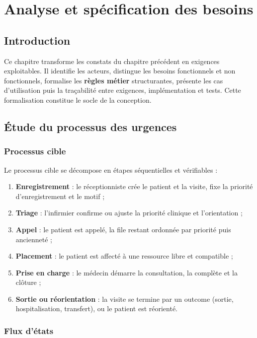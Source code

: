 \chapter{Analyse et spécification des besoins}

\section{Introduction}

Ce chapitre transforme les constats du chapitre précédent en exigences exploitables. Il identifie les acteurs, distingue les besoins fonctionnels et non fonctionnels, formalise les \textbf{règles métier} structurantes, présente les cas d'utilisation puis la traçabilité entre exigences, implémentation et tests. Cette formalisation constitue le socle de la conception.

\section{Étude du processus des urgences}

\subsection{Processus cible}

Le processus cible se décompose en étapes séquentielles et vérifiables :

\begin{enumerate}
    \item \textbf{Enregistrement} : le réceptionniste crée le patient et la visite, fixe la priorité d'enregistrement et le motif ;
    \item \textbf{Triage} : l'infirmier confirme ou ajuste la priorité clinique et l'orientation ;
    \item \textbf{Appel} : le patient est appelé, la file restant ordonnée par priorité puis ancienneté ;
    \item \textbf{Placement} : le patient est affecté à une ressource libre et compatible ;
    \item \textbf{Prise en charge} : le médecin démarre la consultation, la complète et la clôture ;
    \item \textbf{Sortie ou réorientation} : la visite se termine par un outcome (sortie, hospitalisation, transfert), ou le patient est réorienté.
\end{enumerate}

\subsection{Flux d'états}

